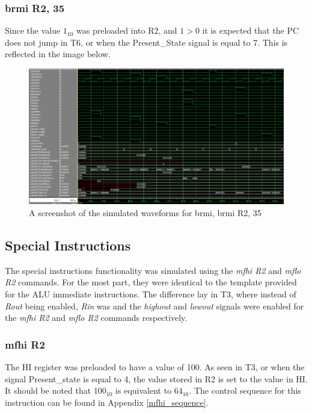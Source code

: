 \documentclass{article}
\begin{document}
        \subsubsection{brmi R2, 35}
            Since the value $1_{10}$ was preloaded into R2, and $1 > 0$ it is expected that the PC does not jump in T6, or when the Present\_State signal is equal to 7. This is reflected in the image below.
        
                \begin{figure}[h!]
                    \begin{center}
                        \includegraphics[width=15cm]{brmi_wave.png}
                        \caption{A screenshot of the simulated waveforms for brmi, brmi R2, 35}
                    \end{center}
                \end{figure}

    \subsection{Special Instructions}
    The special instructions functionality was simulated using the \emph{mfhi R2} and \emph{mflo R2} commands. For the most part, they were identical to the template provided for the ALU immediate instructions. The difference lay in T3, where instead of \emph{Rout} being enabled, \emph{Rin} was and the \emph{highout} and \emph{lowout} signals were enabled for the \emph{mfhi R2} and \emph{mflo R2} commands respectively. 
    
        \subsubsection{mfhi R2}
            The HI register was preloaded to have a value of 100. As seen in T3, or when the signal Present\_state is equal to 4, the value stored in R2 is set to the value in HI. It should be noted that $100_{10}$ is equivalent to $64_{16}$. The control sequence for this instruction can be found in Appendix \ref{mfhi_sequence}.
\end{document}
